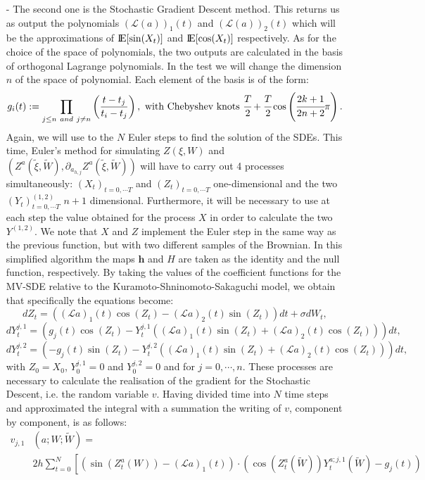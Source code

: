 \documentclass[a4paper,11pt,openright]{report}
\begin{document}
\begin{itemize}
\item[-] The second one is the Stochastic Gradient Descent method. This returns us as output the polynomials $(\mathcal{L}(a))_1(t)$ and $(\mathcal{L}(a))_2(t)$ which will be the approximations of ${\rm I\!E}[\sin(X_t)]$ and ${\rm I\!E}[\cos(X_t)]$ respectively. As for the choice of the space of polynomials, the two outputs are calculated in the basis of orthogonal Lagrange polynomials. In the test we will change the dimension $n$ of the space of polynomial. Each element of the basis is of the form:
\[
g_i(t):=\prod_{j \leq n \ and  \ j\neq n} \left( \frac{t - t_j}{t_i - t_j} \right), \text{ with Chebyshev knots } \cfrac{T}{2} + \cfrac{T}{2} \cos \left( \cfrac{2k + 1}{2n +2} \pi \right).
\]
Again, we will use to the $N$ Euler steps to find the solution of the SDEs. This time, Euler's method for simulating $Z(\xi , W)$ and $\left( Z^a(\tilde{\xi} , \tilde{W}), \partial_{a_{h,j}} Z^a(\tilde{\xi} , \tilde{W}) \right)$ will have to carry out 4 processes simultaneously: $(X_t)_{t=0, \cdots T}$ and $(Z_t)_{t=0, \cdots T}$ one-dimensional and the two $(Y_t)^{(1,2)}_{t=0, \cdots T}$ $n+1$ dimensional. Furthermore, it will be necessary to use at each step the value obtained for the process $X$ in order to calculate the two $Y^{(1,2)}$. We note that $X$ and $Z$ implement the Euler step in the same way as the previous function, but with two different samples of the Brownian. In this simplified algorithm the maps $\textbf{h}$ and $H$ are taken as the identity and the null function, respectively. By taking the values of the coefficient functions for the MV-SDE relative to the Kuramoto-Shninomoto-Sakaguchi model, we obtain that specifically the equations become:
\[
dZ_t = \left( (\mathcal{L}a)_1(t) \cos(Z_t) - (\mathcal{L}a)_2(t) \sin(Z_t) \right) dt + \sigma dW_t, 
\]
\[
dY^{j,1}_t = \left( g_j(t) \cos(Z_t) - Y^{j,1}_t \left( (\mathcal{L}a)_1(t)\sin(Z_t) + (\mathcal{L}a)_2(t)\cos(Z_t)\right) \right)dt, 
\]
\[
dY^{j,2}_t = \left( -g_j(t) \sin(Z_t) - Y^{j,2}_t \left( (\mathcal{L}a)_1(t)\sin(Z_t) + (\mathcal{L}a)_2(t)\cos(Z_t)\right) \right)dt, 
\]
with $Z_0 = X_0$, $Y^{j,1}_0 = 0$ and $Y^{j,2}_0 = 0$ and for $j = 0, \cdots , n$. These processes are necessary to calculate the realisation of the gradient for the Stochastic Descent, i.e. the random variable $v$. Having divided time into $N$ time steps and approximated the integral with a summation the writing of $v$, component by component, is as follows:
\begin{align*}
v_{j,1}&(a; W; \tilde{W}) = \\
&2 h \sum_{t=0}^{N} \left[ \left( \sin(Z^a_t(W)) - (\mathcal{L}a)_1(t) \right) \cdot \left( \cos(Z^a_t(\tilde{W})) Y_t^{a;j,1}(\tilde{W}) - g_j(t) \right) \right.\\

\end{align*}
\end{itemize}
\end{document}
